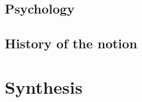 \documentclass{article}
\begin{document}
\subsection{Psychology}

\subsection{History of the notion}





\section{Synthesis}






\end{document}
